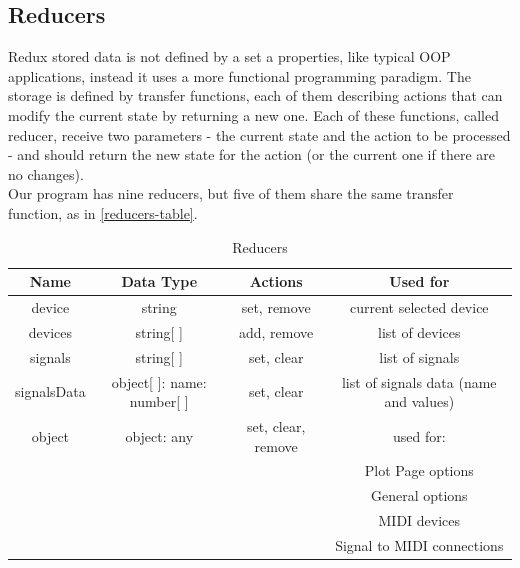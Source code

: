 \subsection{Reducers}
Redux stored data is not defined by a set a properties, like typical OOP applications,
instead it uses a more functional programming paradigm. The storage is defined by transfer
functions, each of them describing actions that can modify the current state by
returning a new one. Each of these functions, called reducer, receive two parameters -
the current state and the action to be processed - and should return the new state
for the action (or the current one if there are no changes). \\
Our program has nine reducers, but five of them share the same transfer function,
as in \autoref{reducers-table}.
\begin{table}[htb]
  \ABNTEXreducedfont
  \caption[Reducers]{Reducers}
  \label{reducers-table}
  \centering
  \begin{tabular}{c|c|c|c}
    \textbf{Name} & \textbf{Data Type} & \textbf{Actions} & \textbf{Used for} \\
		\hline \hline
		device & string & set, remove & current selected device \\
		\hline
		devices & string[ ] & add, remove & list of devices \\
		\hline
		signals & string[ ] & set, clear & list of signals \\
		\hline
		signalsData & object[ ]: {name: number[ ]} & set, clear & list of signals data (name and values) \\
		\hline
		object & object: any & set, clear, remove & used for: \\
																					& & & Plot Page options \\
																					& & & General options \\
																					& & & MIDI devices \\
																					& & & Signal to MIDI connections \\

  \end{tabular}
\end{table}


